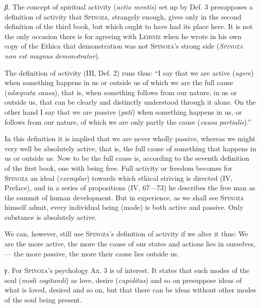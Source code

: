 \documentclass[12pt]{article}
\newcommand{\opage}[1]{\marginnote{\footnotesize\textit{[#1]}}}
\begin{document}
\textit{β.} The concept of spiritual activity (\textit{actio mentis}) set up by Def. 3
presupposes a definition of activity that \textsc{Spinoza}, strangely enough, gives only in
the second definition of the third book, but which ought to have had its place here. It is
not the only occasion there is for agreeing with \textsc{Leibniz} when he wrote in his own
copy of the Ethica that demonstration was not \textsc{Spinoza}'s strong side
(\textit{\textsc{Spinoza} non est magnus demonstrator}).

The definition of activity (III, Def. 2) runs thus: ``I say that we are active
(\textit{agere}) when something happens in us or outside us of which we are the full cause
(\textit{adæqvata causa}), that is, when something follows from our nature, in us or
outside us, that can be clearly and distinctly understood through it alone. On the other
hand I say that we are passive (\textit{pati}) when something happens in us, or follows
from our nature, of which we are only partly the cause (\textit{causa
partialis}).''

In this definition it is implied that we are never wholly passive, whereas we might very
well be absolutely active, that is, the full cause of something that happens in us or
outside us. Now to be the full cause is, according to the seventh definition of the first
book, one with being free. Full activity or freedom becomes for \textsc{Spinoza} an ideal
(\textit{exemplar}) towards which ethical striving is directed (IV, Preface), and in a
series of propositions (IV, 67---73) he describes the free man as the summit of human
development. But in experience, as we shall see \textsc{Spinoza} himself admit, every
individual being (mode) is both active and passive. Only substance is absolutely active.

We can, however, still use \textsc{Spinoza}'s definition of activity if we alter it thus:
We are the more active, the more the cause of our states and actions lies in ourselves,
--- the more passive, the more their cause lies outside us.

\opage{38}\textit{γ.} For \textsc{Spinoza}'s psychology Ax. 3 is of interest. It states
that such modes of the soul (\textit{modi cogitandi}) as love, desire
(\textit{cupiditas}) and so on presuppose ideas of what is loved, desired and so on, but
that there can be ideas without other modes of the soul being present.
\end{document}
